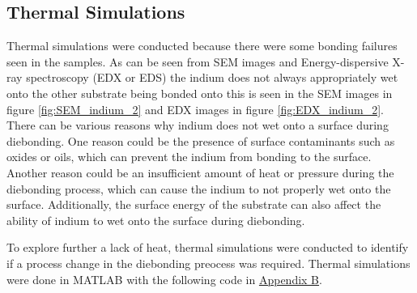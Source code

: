 \newpage
\subsection{Thermal Simulations}

Thermal simulations were conducted because there were some bonding failures seen in the samples. As can be seen from SEM images and Energy-dispersive X-ray spectroscopy (EDX or EDS) the indium does not always appropriately wet onto the other substrate being bonded onto this is seen in the SEM images in figure \ref{fig:SEM_indium_2} and EDX images in figure \ref{fig:EDX_indium_2}. There can be various reasons why indium does not wet onto a surface during diebonding. One reason could be the presence of surface contaminants such as oxides or oils, which can prevent the indium from bonding to the surface. Another reason could be an insufficient amount of heat or pressure during the diebonding process, which can cause the indium to not properly wet onto the surface. Additionally, the surface energy of the substrate can also affect the ability of indium to wet onto the surface during diebonding.

To explore further a lack of heat, thermal simulations were conducted to identify if a process change in the diebonding preocess was required. Thermal simulations were done in MATLAB with the following code in  \hyperref[sec:ThermalSimulationCode]{Appendix B}.



